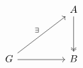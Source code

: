 \[\begin{tikzcd}
	&& A \\
	\\
	G && B
	\arrow[two heads, from=1-3, to=3-3]
	\arrow[from=3-1, to=3-3]
	\arrow["\exists", from=3-1, to=1-3]
\end{tikzcd}\]